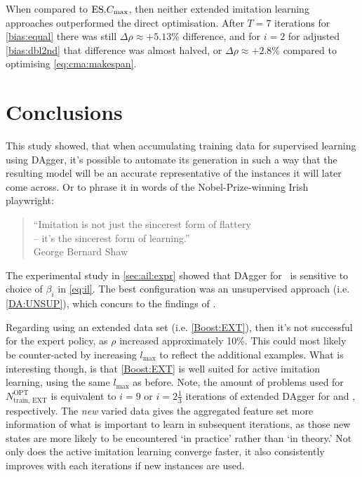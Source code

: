 When compared to $\text{ES}.{C_{\max}}$, then neither extended imitation learning 
approaches outperformed the direct optimisation. After $T=7$ iterations for 
\ref{bias:equal} there was still $\Delta\rho\approx+5.13\%$ difference, and for 
$i=2$ for adjusted \ref{bias:dbl2nd} that difference was almost halved, or 
$\Delta\rho\approx+2.8\%$ compared to optimising \cref{eq:cma:makespan}. 
						
\section{Conclusions}
This study showed, that when accumulating training data for supervised  
learning using DAgger, it's possible to automate its generation in such a way 
that the resulting model will be an accurate representative of the instances 
it will later come across. 
Or to phrase it in words of the Nobel-Prize-winning Irish playwright:
\begin{quote}
    ``Imitation is not just the sincerest form of flattery \\ -- it's the 
    sincerest form of learning.'' \\
    \raggedleft George Bernard Shaw
\end{quote} 

The experimental study in \cref{sec:ail:expr} showed that DAgger for \jsp\ is 
sensitive to choice of $\beta_i$ in \cref{eq:il}. The best configuration was 
an unsupervised approach (i.e. \ref{DA:UNSUP}), which concurs to the findings 
of \cite{RossGB11}.

Regarding using an extended data set (i.e. \ref{Boost:EXT}), then it's not 
successful for the expert policy, as $\rho$ increased approximately 10\%. This 
could most likely be 
counter-acted by increasing $l_{\max}$ to reflect the additional examples.
What is interesting though, is that \ref{Boost:EXT} is well suited for 
active imitation learning, using the same $l_{\max}$ as before. 
Note, the amount of problems used for $N^{\text{OPT}}_{\text{train, EXT}}$ is 
equivalent to $i=9$ or $i=2\tfrac{1}{3}$ iterations of extended DAgger 
for \Problem[6\times5]{\train} and , respectively.
The \emph{new} varied data gives the aggregated feature set more information 
of what is important to learn in subsequent iterations, as those new states are 
more likely to be encountered `in practice' rather than `in theory.' 
Not only does the active imitation learning converge faster, it also 
consistently improves with each iterations if new instances are used.

